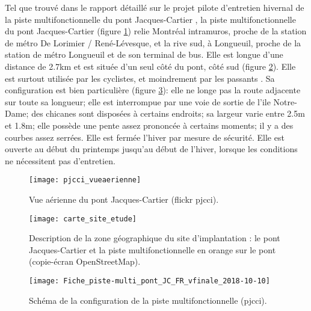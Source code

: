 ﻿Tel que trouvé dans le rapport détaillé sur le projet pilote d'entretien hivernal de la piste multifonctionnelle du pont Jacques-Cartier \cite{pjcci_rapport_2018}, la piste multifonctionnelle du pont Jacques-Cartier (figure \ref{fig:pjcci_vueaerienne}) relie Montréal intramuros, proche de la station de métro De Lorimier / René-Lévesque, et la rive sud, à Longueuil, proche de la station de métro Longueuil et de son terminal de bus. Elle est longue d'une distance de 2.7km et est située d'un seul côté du pont, côté sud (figure \ref{fig:carte_site_etude_openstreetmap}). Elle est surtout utilisée par les cyclistes, et moindrement par les passants \cite{pjcci_rapport_2018}.
Sa configuration est bien particulière \cite{pjcci_fiche_2018} (figure \ref{fig:Fiche_piste-multi_pont_JC_FR_vfinale_2018-10-10}): elle ne longe pas la route adjacente sur toute sa longueur; elle est interrompue par une voie de sortie de l'ile Notre-Dame; des chicanes sont disposées à certains endroits; sa largeur varie entre 2.5m et 1.8m; elle possède une pente assez prononcée à certains moments; il y a des courbes assez serrées.
Elle est fermée l'hiver par mesure de sécurité. Elle est ouverte au début du printemps jusqu'au début de l'hiver, lorsque les conditions ne nécessitent pas d'entretien.
\begin{figure}[H]
    \centering
    \texttt{[image: pjcci\_vueaerienne]}
    \caption[Vue aérienne du pont Jacques-Cartier]{Vue aérienne du pont Jacques-Cartier (flickr \acrshort{pjcci})\protect\footnotemark.}
    \label{fig:pjcci_vueaerienne}
\end{figure}
\begin{figure}[H]
    \centering
    \texttt{[image: carte\_site\_etude]}
    \caption[Carte du site d'implantation]{Description de la zone géographique du site d'implantation : le pont Jacques-Cartier et la piste multifonctionnelle en orange sur le pont (copie-écran OpenStreetMap).}
    \label{fig:carte_site_etude_openstreetmap}
\end{figure}
\begin{figure}[H]
    \centering
    \texttt{[image: Fiche\_piste-multi\_pont\_JC\_FR\_vfinale\_2018-10-10]}
    \caption[Schéma de la configuration de la piste multifonctionnelle]{Schéma de la configuration de la piste multifonctionnelle (\acrshort{pjcci})\protect\footnotemark.}
    \label{fig:Fiche_piste-multi_pont_JC_FR_vfinale_2018-10-10}
\end{figure}

